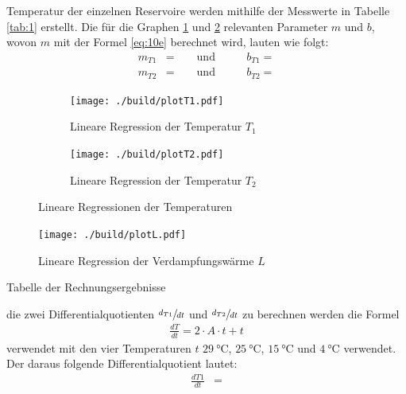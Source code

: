 \justifying Temperatur der einzelnen Reservoire werden mithilfe der Messwerte in Tabelle \ref{tab:1} erstellt. Die für
die Graphen \ref{fig:3a} und \ref{fig:3b} relevanten Parameter $m$ und $b$, wovon $m$ mit der Formel \eqref{eq:10e} berechnet wird, lauten 
wie folgt:
\begin{subequations}
\begin{align}
    m_{T1} &= \text{} \qquad \text{und} \qquad &b_{T1} = \text{} \label{eq:11a}\\
    m_{T2} &= \text{} \qquad \text{und} \qquad &b_{T2} = \text{} \label{eq:11b}
\end{align}
\end{subequations}

\begin{figure}[H]
    \begin{subfigure}{0.495\linewidth}
        \centering
        \texttt{[image: ./build/plotT1.pdf]}
        \caption{Lineare Regression der Temperatur $T_1$}
        \label{fig:3a}
    \end{subfigure}
    \begin{subfigure}{0.495\linewidth}
        \centering
        \texttt{[image: ./build/plotT2.pdf]}
        \caption{Lineare Regression der Temperatur $T_2$}
        \label{fig:3b}
    \end{subfigure}
    \caption{Lineare Regressionen der Temperaturen}
    \label{fig:3}
\end{figure}

\begin{figure}[H]
    \centering
    \texttt{[image: ./build/plotL.pdf]}
    \caption{Lineare Regression der Verdampfungswärme $L$}
    \label{fig:4}
\end{figure}

\begin{table}[H]
    \centering
    
    \caption{Tabelle der Rechnungsergebnisse}
    \label{tab:2}
\end{table}



\justifying die zwei Differentialquotienten $\sfrac{d_{T1}}{dt}$ und $\sfrac{d_{T2}}{dt}$ zu berechnen werden die Formel
\begin{align}
    \frac{dT}{dt} = 2 \cdot A \cdot t + t \label{eq:12}
\end{align}
verwendet mit den vier Temperaturen $t$ $\SI{29}{\celsius}$, $\SI{25}{\celsius}$, $\SI{15}{\celsius}$ und $\SI{4}{\celsius}$ verwendet. 
Der daraus folgende Differentialquotient lautet:
\begin{align}
    \frac{dT1}{dt} &= \text{} \label{eq:13}
\end{align}

